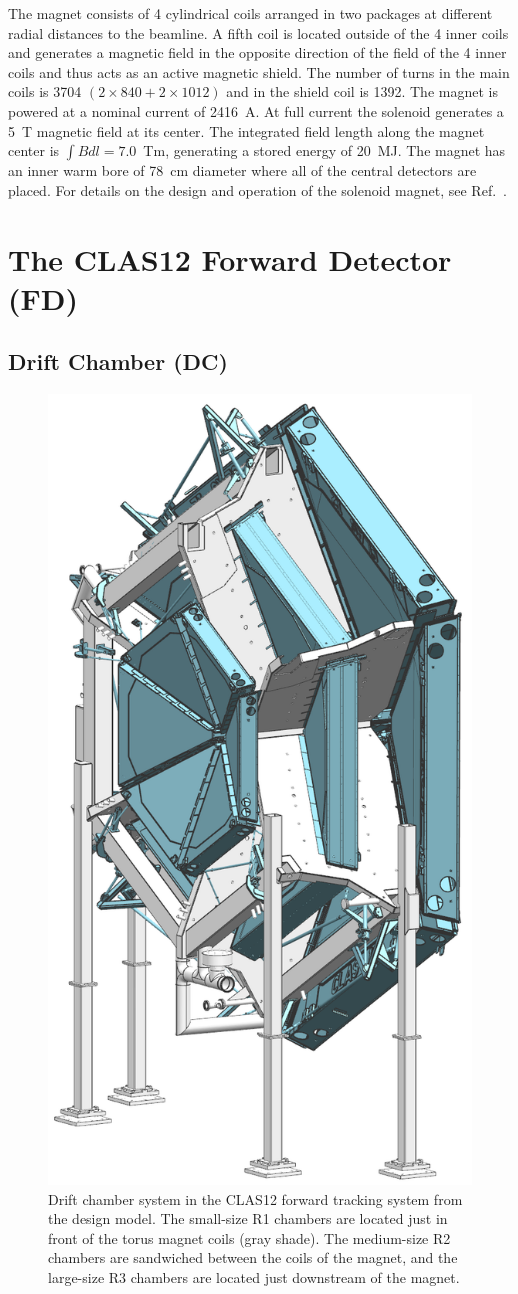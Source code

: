 \documentclass[final,3p,twocolumn]{elsarticle}
\begin{document}
The magnet consists of 4 cylindrical coils arranged in two packages at different radial distances to the beamline.
A fifth coil is located outside of the 4 inner coils and generates a magnetic field in the opposite direction of the
field of the 4 inner coils and thus acts as an active magnetic shield. The number of turns in the main coils is 3704
$(2 \times 840 + 2 \times 1012)$ and in the shield coil is 1392. The magnet is powered at a nominal current of
2416~A. At full current the solenoid generates a 5~T magnetic field at its center. The integrated field length along
the magnet center is $\int \!\! Bdl = 7.0$~Tm, generating a stored energy of 20~MJ. The magnet has an inner warm
bore of 78~cm diameter where all of the central detectors are placed.  For details on the design and operation of the
solenoid magnet, see Ref.~\cite{clas12-magnets}.

\section{The CLAS12 Forward Detector (FD)}

\subsection{Drift Chamber (DC)}
\begin{figure}[ht!]
\centerline{\includegraphics[width=0.60\columnwidth]{dc-view-4.png}}
\caption{Drift chamber system in the CLAS12 forward tracking system from the design model. The small-size R1
  chambers are located just in front of the torus magnet coils (gray shade). The medium-size R2 chambers are
  sandwiched between the coils of the magnet, and the large-size R3 chambers are located just downstream of the
  magnet.}
\label{clas12-dc}
\end{figure}
\end{document}
